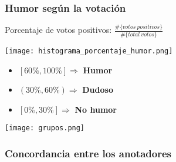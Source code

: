 \begin{frame}[allowframebreaks]
    \frametitle{Humor según la votación}

    Porcentaje de votos positivos: $\frac{\#\{votos\ positivos\}}{\#\{total\ votos\}}$

    \begin{center}
        \texttt{[image: histograma\_porcentaje\_humor.png]}
    \end{center}

    \begin{itemize}
        \item $[60\%, 100\%] \Rightarrow$ \textbf{Humor}
        \item $(30\%, 60\%) \Rightarrow$ \textbf{Dudoso}
        \item $[0\%, 30\%] \Rightarrow$ \textbf{No humor}
    \end{itemize}

    \framebreak

    \begin{center}
        \texttt{[image: grupos.png]}
    \end{center}
\end{frame}

\subsubsection{Concordancia entre los anotadores}

